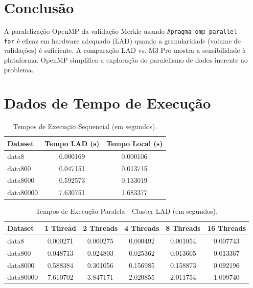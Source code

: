 \documentclass[10pt,a4paper]{article}
\begin{document}
\section*{Conclusão}
A paralelização OpenMP da validação Merkle usando \texttt{\#pragma omp parallel for} é eficaz em hardware adequado (LAD) quando a granularidade (volume de validações) é suficiente. A comparação LAD vs. M3 Pro mostra a sensibilidade à plataforma. OpenMP simplifica a exploração do paralelismo de dados inerente ao problema.

\onecolumn
\clearpage

\appendix
\renewcommand{\thesection}{\Alph{section}}

\section{Dados de Tempo de Execução}
\label{app:dados}

\begin{table}[H]
    \centering
    \caption{Tempos de Execução Sequencial (em segundos).}
    \label{tab:seq_times}
    \begin{tabular}{l S[table-format=1.6] S[table-format=1.6]}
        \toprule
        Dataset   & {Tempo LAD (s)} & {Tempo Local (s)} \\
        \midrule
        data8     & 0.000169      & 0.000106        \\
        data800   & 0.047151      & 0.013715        \\
        data8000  & 0.592573      & 0.133019        \\
        data80000 & 7.630751      & 1.683377        \\
        \bottomrule
    \end{tabular}
\end{table}

\begin{table}[H]
    \centering
    \caption{Tempos de Execução Paralela - Cluster LAD (em segundos).}
    \label{tab:par_times_lad}
    \begin{tabular}{l S S S S S}
        \toprule
        Dataset   & {1 Thread} & {2 Threads} & {4 Threads} & {8 Threads} & {16 Threads} \\
        \midrule
        data8     & 0.000271 & 0.000275 & 0.000492 & 0.001054 & 0.007743 \\
        data800   & 0.048713 & 0.024803 & 0.025362 & 0.013605 & 0.013367 \\
        data8000  & 0.588384 & 0.301056 & 0.156985 & 0.158873 & 0.092196 \\
        data80000 & 7.610702 & 3.847171 & 2.020855 & 2.011754 & 1.009740 \\
        \bottomrule
    \end{tabular}
\end{table}
\end{document}

